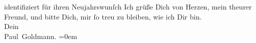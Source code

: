 \begin{ledgroupsized}[t]{13cm}
{{{                  identifiziert}}}\label{K_L02605-1h} für ihren Neujahrswunſch\pend
           \pstart
           Ich grüße Dich von Herzen, mein theurer Freund, und bitte Dich, mir ſo treu zu
               bleiben, wie ich Dir bin. {\\[\baselineskip]}Dein {\\[\baselineskip]}\spacefill\mbox{Paul Goldmann.}\pend
           \leftskip=0em{}\endnumbering{}\end{ledgroupsized}  \newcommand{\dateiname}{L02605}\newcommand{\titel}{Paul Goldmann an Arthur Schnitzler, 8. 1. [1894]}\newcommand{\editorInnen}{Martin Anton Müller und Laura Untner}
      